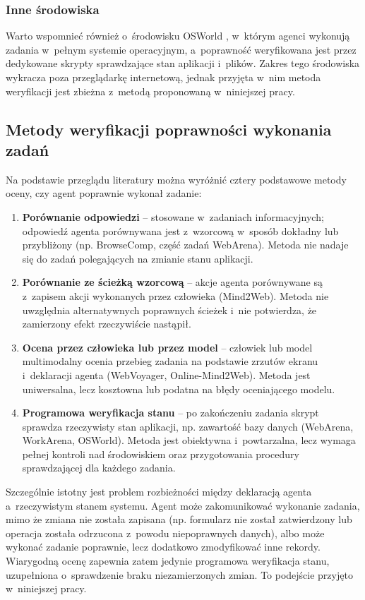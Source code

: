 \subsubsection{Inne środowiska}
Warto wspomnieć również o~środowisku OSWorld \citep{xie2024osworld}, w~którym agenci wykonują zadania w~pełnym systemie operacyjnym, a~poprawność weryfikowana jest przez dedykowane skrypty sprawdzające stan aplikacji i~plików. Zakres tego środowiska wykracza poza przeglądarkę internetową, jednak przyjęta w~nim metoda weryfikacji jest zbieżna z~metodą proponowaną w~niniejszej pracy.

\subsection{Metody weryfikacji poprawności wykonania zadań}
\label{sec:weryfikacja}
Na podstawie przeglądu literatury można wyróżnić cztery podstawowe metody oceny, czy agent poprawnie wykonał zadanie:
\begin{enumerate}
    \item \textbf{Porównanie odpowiedzi} -- stosowane w~zadaniach informacyjnych; odpowiedź agenta porównywana jest z~wzorcową w~sposób dokładny lub przybliżony (np. BrowseComp, część zadań WebArena). Metoda nie nadaje się do zadań polegających na zmianie stanu aplikacji.
    \item \textbf{Porównanie ze ścieżką wzorcową} -- akcje agenta porównywane są z~zapisem akcji wykonanych przez człowieka (Mind2Web). Metoda nie uwzględnia alternatywnych poprawnych ścieżek i~nie potwierdza, że zamierzony efekt rzeczywiście nastąpił.
    \item \textbf{Ocena przez człowieka lub przez model} -- człowiek lub model multimodalny ocenia przebieg zadania na podstawie zrzutów ekranu i~deklaracji agenta (WebVoyager, Online-Mind2Web). Metoda jest uniwersalna, lecz kosztowna lub podatna na błędy oceniającego modelu.
    \item \textbf{Programowa weryfikacja stanu} -- po zakończeniu zadania skrypt sprawdza rzeczywisty stan aplikacji, np. zawartość bazy danych (WebArena, WorkArena, OSWorld). Metoda jest obiektywna i~powtarzalna, lecz wymaga pełnej kontroli nad środowiskiem oraz przygotowania procedury sprawdzającej dla każdego zadania.
\end{enumerate}

Szczególnie istotny jest problem rozbieżności między deklaracją agenta a~rzeczywistym stanem systemu. Agent może zakomunikować wykonanie zadania, mimo że zmiana nie została zapisana (np. formularz nie został zatwierdzony lub operacja została odrzucona z~powodu niepoprawnych danych), albo może wykonać zadanie poprawnie, lecz dodatkowo zmodyfikować inne rekordy. Wiarygodną ocenę zapewnia zatem jedynie programowa weryfikacja stanu, uzupełniona o~sprawdzenie braku niezamierzonych zmian. To podejście przyjęto w~niniejszej pracy.

